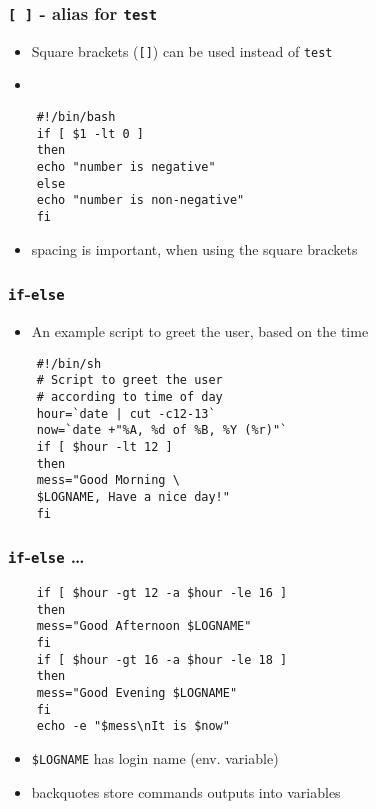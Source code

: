 \documentclass[12pt,compress]{beamer}
\newcounter{time}
\begin{document}
\begin{frame}[fragile]
  \frametitle{\texttt{[ ]} - alias for \texttt{test}}
  \begin{itemize}
  \item Square brackets (\texttt{[]}) can be used instead of
    \texttt{test}
  \item 
  \end{itemize}
  \begin{lstlisting}
    #!/bin/bash
    if [ $1 -lt 0 ]
    then
    echo "number is negative"
    else
    echo "number is non-negative"
    fi
  \end{lstlisting} %
  \begin{itemize}
  \item \alert{spacing is important, when using the square brackets}
  \end{itemize}
\end{frame}

\begin{frame}[fragile]
  \frametitle{\texttt{if}-\texttt{else}}
  \begin{itemize}
  \item An example script to greet the user, based on the time
  \end{itemize}
  \begin{lstlisting}
    #!/bin/sh
    # Script to greet the user 
    # according to time of day
    hour=`date | cut -c12-13`
    now=`date +"%A, %d of %B, %Y (%r)"`
    if [ $hour -lt 12 ]
    then
    mess="Good Morning \
    $LOGNAME, Have a nice day!"
    fi
  \end{lstlisting} %
\end{frame}

\begin{frame}[fragile]
  \frametitle{\texttt{if}-\texttt{else} \ldots}
  \begin{lstlisting}
    if [ $hour -gt 12 -a $hour -le 16 ]
    then
    mess="Good Afternoon $LOGNAME"
    fi
    if [ $hour -gt 16 -a $hour -le 18 ]
    then
    mess="Good Evening $LOGNAME"
    fi
    echo -e "$mess\nIt is $now"
  \end{lstlisting} %
  \begin{itemize}
  \item \texttt{\$LOGNAME} has login name (env. variable) 
  \item backquotes store commands outputs into variables
  \end{itemize}
\end{frame}
\end{document}

